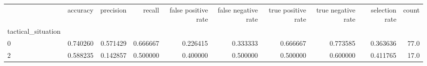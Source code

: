 \begin{tabular}{lrrrrrrrrr}
\toprule
{} &  accuracy &  precision &    recall &  false positive rate &  false negative rate &  true positive rate &  true negative rate &  selection rate &  count \\
tactical\_situation &           &            &           &                      &                      &                     &                     &                 &        \\
\midrule
0                  &  0.740260 &   0.571429 &  0.666667 &             0.226415 &             0.333333 &            0.666667 &            0.773585 &        0.363636 &   77.0 \\
2                  &  0.588235 &   0.142857 &  0.500000 &             0.400000 &             0.500000 &            0.500000 &            0.600000 &        0.411765 &   17.0 \\
\bottomrule
\end{tabular}
